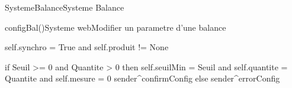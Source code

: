 \begin{OM}{SystemeBalance}{Systeme Balance}
    \begin{OMOperation}{configBal()}{Systeme web}{Modifier un parametre d'une balance}
        \begin{OMMessages}
        \end{OMMessages}

        \begin{OMPre}
self.synchro = True and self.produit != None
        \end{OMPre}

        \begin{OMPost}
if Seuil >= 0 and Quantite > 0 then
    self.seuilMin = Seuil
    and self.quantite = Quantite and
    self.mesure = 0
    sender^confirmConfig
else
    sender^errorConfig
        \end{OMPost}
    \end{OMOperation}
\end{OM}
